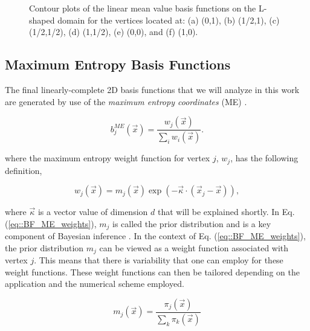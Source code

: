 \begin{figure}
\begin{subfigure}[b]{0.39\textwidth}
		\caption{}
	\end{subfigure}
\caption{Contour plots of the linear mean value basis functions on the L-shaped domain for the vertices located at: (a) (0,1), (b) (1/2,1), (c) (1/2,1/2), (d) (1,1/2), (e) (0,0), and (f) (1,0).}
\label{fig::2D_MV1_Ldom_basis_functions}
\end{figure}





\subsection{Maximum Entropy Basis Functions}
\label{sec::BF_2DLinear_ME}

The final linearly-complete 2D basis functions that we will analyze in this work are generated by use of the {\em maximum entropy coordinates} (ME) \cite{sukumar2004construction,arroyo2006local,hormann2008maximum}. 

\begin{equation}
\label{eq::BF_ME_BF}
b_{j}^{ME} (\vec{x}) = \frac{w_j (\vec{x}) }{\sum_i w_i (\vec{x})} .
\end{equation}

\noindent where the maximum entropy weight function for vertex $j$, $w_j$, has the following definition,

\begin{equation}
\label{eq::BF_ME_weights}
w_j (\vec{x})  = m_j(\vec{x}) \exp(-  \vec{\kappa} \cdot (\vec{x}_j - \vec{x})),
\end{equation}

\noindent where $\vec{\kappa}$ is a vector value of dimension $d$ that will be explained shortly. In Eq. (\ref{eq::BF_ME_weights}), $m_j$ is called the prior distribution and is a key component of Bayesian inference \cite{kullback1951information,jaynes1963information}. In the context of Eq. (\ref{eq::BF_ME_weights}), the prior distribution $m_j$ can be viewed as a weight function associated with vertex $j$. This means that there is variability that one can employ for these weight functions. These weight functions can then be tailored depending on the application and the numerical scheme employed. 

\begin{equation}
\label{eq::BF_ME_prior_funcs}
 m_j(\vec{x}) = \frac{\pi_j (\vec{x}) }{\sum_{k} \pi_k (\vec{x})}
\end{equation}


